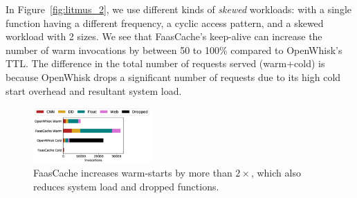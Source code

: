 In Figure~\ref{fig:litmus_2}, we use different kinds of \emph{skewed} workloads: with a single function having a different frequency, a cyclic access pattern, and a skewed workload with 2 sizes. 
We see that FaasCache's keep-alive can increase the number of warm invocations by between 50 to 100\% compared to OpenWhisk's TTL.
The difference in the total number of requests served (warm+cold) is because OpenWhisk drops a significant number of requests due to its high cold start overhead and resultant system load. 
%







\begin{figure}[t]
  \centering
\includegraphics[width=0.4\textwidth]{../graphs/litmus_tests/faasbench_48_cold_hot-legend.pdf}
\caption{FaasCache increases warm-starts by more than $2\times$, which also reduces system load and dropped functions.}
\label{fig:faasbench}
\end{figure}

